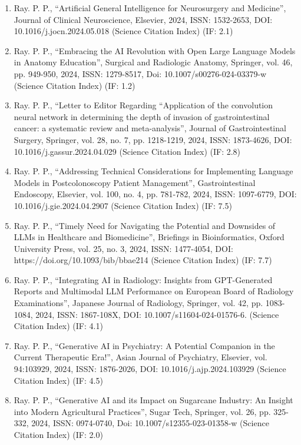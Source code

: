 \documentclass[11pt,a4paper]{moderncv}
\begin{document}
\begin{adjustwidth}{6em}{0pt}
\begin{enumerate}
		\item Ray. P. P., “Artificial General Intelligence for Neurosurgery and Medicine”, Journal of Clinical Neuroscience, Elsevier, 2024, ISSN: 1532-2653, DOI: 10.1016/j.jocn.2024.05.018 (Science Citation Index) (IF: 2.1)
		
		\item Ray. P. P., “Embracing the AI Revolution with Open Large Language Models in Anatomy Education”, Surgical and Radiologic Anatomy, Springer, vol. 46, pp. 949-950, 2024, ISSN: 1279-8517, Doi: 10.1007/s00276-024-03379-w (Science Citation Index) (IF: 1.2)
		
		\item Ray. P. P., “Letter to Editor Regarding “Application of the convolution neural network in determining the depth of invasion of gastrointestinal cancer: a systematic review and meta-analysis”, Journal of Gastrointestinal Surgery, Springer, vol. 28, no. 7, pp. 1218-1219, 2024, ISSN: 1873-4626, DOI: 10.1016/j.gassur.2024.04.029 (Science Citation Index) (IF: 2.8)
		
		\item Ray. P. P., “Addressing Technical Considerations for Implementing Language Models in Postcolonoscopy Patient Management”, Gastrointestinal Endoscopy, Elsevier, vol. 100, no. 4, pp. 781-782, 2024, ISSN: 1097-6779, DOI: 10.1016/j.gie.2024.04.2907 (Science Citation Index) (IF: 7.5)
		
		\item Ray. P. P., “Timely Need for Navigating the Potential and Downsides of LLMs in Healthcare and Biomedicine”, Briefings in Bioinformatics, Oxford University Press, vol. 25, no. 3, 2024, ISSN: 1477-4054, DOI: https://doi.org/10.1093/bib/bbae214 (Science Citation Index) (IF: 7.7)
		
		\item Ray. P. P., “Integrating AI in Radiology: Insights from GPT-Generated Reports and Multimodal LLM Performance on European Board of Radiology Examinations”, Japanese Journal of Radiology, Springer, vol. 42, pp. 1083-1084, 2024, ISSN: 1867-108X, DOI: 10.1007/s11604-024-01576-6. (Science Citation Index) (IF: 4.1)
		
		\item Ray. P. P., “Generative AI in Psychiatry: A Potential Companion in the Current Therapeutic Era!”, Asian Journal of Psychiatry, Elsevier, vol. 94:103929, 2024, ISSN: 1876-2026, DOI: 10.1016/j.ajp.2024.103929 (Science Citation Index) (IF: 4.5)
		
		\item Ray. P. P., “Generative AI and its Impact on Sugarcane Industry: An Insight into Modern Agricultural Practices”, Sugar Tech, Springer, vol. 26, pp. 325-332, 2024, ISSN: 0974-0740, Doi: 10.1007/s12355-023-01358-w (Science Citation Index) (IF: 2.0)
		

\end{enumerate}
\end{adjustwidth}
\end{document}
